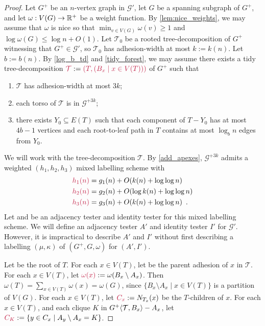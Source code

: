 \begin{proof}
  Let $G^+$ be an $n$-vertex graph in $\mathcal{G}'$, let $G$ be a spanning subgraph of $G^+$, and let $\omega:V(G)\to\mathbb{R}^+$ be a weight function. By \cref{lem:nice_weights}, we may assume that $\omega$ is nice so that $\min_{v\in V(G)}\omega(v)\ge 1$ and $\log\omega(G)\le \log n + O(1)$. Let $\mathcal{T}_0$ be a rooted tree-decomposition of $G^+$ witnessing that $G^+\in\mathcal{G}'$, so $\mathcal{T}_0$ has adhesion-width at most $k:=k(n)$. Let $b:=b(n)$.
  By \cref{log_b_td} and \cref{tidy_forest}, we may assume there exists a tidy tree-decomposition $\mathdefin{\mathcal{T}}:=\mathdefin{(T,(B_x\mid x\in V(T)))}$ of $G^+$ such that
  \begin{enumerate}[nosep,nolistsep,label=(P\arabic*)]
    \item\label{td_width} $\mathcal{T}$ has adhesion-width at most $3k$;
    \item each torso of $\mathcal{T}$ is in $\mathcal{G}^{+3k}$;
    \item\label{tprops_y0} there exists $Y_0\subseteq E(T)$ such that each component of $T-Y_0$ has at most $4b-1$ vertices and each root-to-leaf path in $T$ contains at most $\log_b n$ edges from $Y_0$.    
  \end{enumerate}
  We will work with the tree-decomposition $\mathcal{T}$.  By \cref{add_apexes}, $\mathcal{G}^{+3k}$ admits a weighted $(h_1,h_2,h_3)$ mixed labelling scheme with 
  \begin{align}
    \mathdefin{h_1(n)} & = g_1(n) + \Oh(k(n)+\log\log n) \label{h1_td} \\ 
    \mathdefin{h_2(n)} & = g_2(n) + \Oh(\log k(n) + \log\log n) \label{h2_td} \\ 
    \mathdefin{h_3(n)} & = g_3(n) + \Oh(k(n) + \log\log n) \enspace \label{h3_td} . 
  \end{align} 
  Let  and  be an adjacency tester and identity tester for this mixed labelling scheme.  We will define an adjacency tester $A'$ and identity tester $I'$ for $\mathcal{G}'$.  However, it is impractical to describe $A'$ and $I'$ without first describing a labelling $(\mu,\kappa)$ of $(G^+,G,\omega)$ for $(A',I')$.


  Let  be the root of $T$. For each $x\in V(T)$, let  be the parent adhesion of $x$ in $\mathcal{T}$. For each $x\in V(T)$, let $\mathdefin{\omega(x)}:=\omega(B_x\setminus A_x)$. Then $\omega(T)=\sum_{x\in V(T)}\omega(x)=\omega(G)$, since $\{B_x\setminus A_x\mid x\in V(T)\}$ is a partition of $V(G)$.  For each $x\in V(T)$, let $\mathdefin{C_x}:=N_{T_x}(x)$ be the $T$-children of $x$. For each $x\in V(T)$, and each clique $K$ in ${G^+}\langle{\mathcal{T},B_x}\rangle-A_x$, let $\mathdefin{C_K}:=\{y\in C_x\mid A_y\setminus A_x=K\}$. 


\end{proof}

